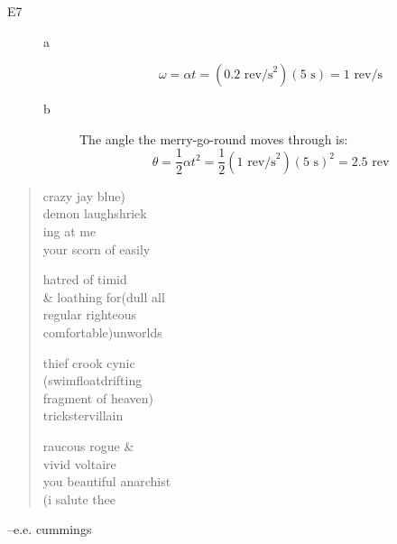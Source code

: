\documentclass{exam}
\begin{document}
\begin{description}
\item[E7]

\begin{description}
\item[a]
\[
  \omega = \alpha t = (0.2 \text{ rev/s}^2)(5 \text{ s}) = 1 \text{ rev/s}
\]

\item[b]
The angle the merry-go-round moves through is:
\[
  \theta = \frac{1}{2} \alpha t^2 = \frac{1}{2} (1 \text{ rev/s}^2) (5 \text{ s})^2 = 2.5 \text{ rev}
\]

\end{description}


\end{description}

\fi


\vspace{4.5 in}

\ifprintanswers
\else
\begin{verse}
crazy jay blue) \\
demon laughshriek \\
ing at me \\
your scorn of easily 

hatred of timid \\
\& loathing for(dull all \\
regular righteous \\
comfortable)unworlds 

thief crook cynic \\
(swimfloatdrifting \\
fragment of heaven) \\
trickstervillain 

raucous rogue \& \\
vivid voltaire \\
you beautiful anarchist \\
(i salute thee
\end{verse}

\vspace{.2 cm}
\hspace{1 cm} --e.e. cummings

\fi
\end{document}
